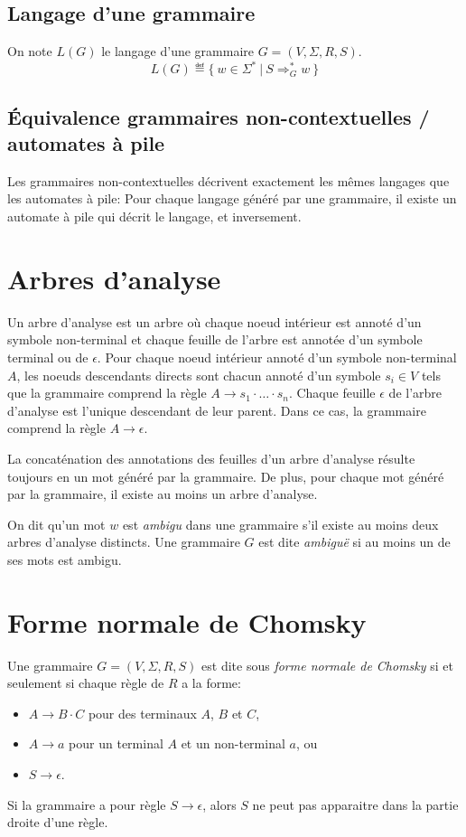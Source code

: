 \subsection{Langage d'une grammaire}

On note $L(G)$ le langage d'une grammaire $G = (V, \Sigma, R, S)$.
\[
L(G) \eqdef \{\ w \in \Sigma^*\ |\ S \Rightarrow_G^* w\ \}
\]

\subsection{Équivalence grammaires non-contextuelles / automates à pile}

Les grammaires non-contextuelles décrivent exactement les mêmes langages que les automates à pile:
Pour chaque langage généré par une grammaire, il existe un automate à pile qui décrit le langage, et inversement.

\section{Arbres d'analyse}

Un arbre d'analyse est un arbre où chaque noeud intérieur est annoté d'un symbole non-terminal et chaque feuille de l'arbre est annotée d'un symbole terminal ou de $\epsilon$.
Pour chaque noeud intérieur annoté d'un symbole non-terminal $A$, les noeuds descendants directs sont chacun annoté d'un symbole $s_i \in V$ tels que la grammaire comprend la règle $A \to s_1 \cdot \ldots \cdot s_n$.
Chaque feuille $\epsilon$ de l'arbre d'analyse est l'unique descendant de leur parent. Dans ce cas, la grammaire comprend la règle $A \to \epsilon$.

La concaténation des annotations des feuilles d'un arbre d'analyse résulte toujours en un mot généré par la grammaire.
De plus, pour chaque mot généré par la grammaire, il existe au moins un arbre d'analyse.

On dit qu'un mot $w$ est \og \textit{ambigu} \fg{} dans une grammaire s'il existe au moins deux arbres d'analyse distincts.
Une grammaire $G$ est dite \og \textit{ambiguë} \fg{} si au moins un de ses mots est ambigu.

\section{Forme normale de Chomsky}

Une grammaire $G = (V, \Sigma, R, S)$ est dite sous \og \textit{forme normale de Chomsky} \fg{} si et seulement si chaque règle de $R$ a la forme:
\begin{itemize}
\item $A \to B \cdot C$ pour des terminaux $A$, $B$ et $C$,
\item $A \to a$ pour un terminal $A$ et un non-terminal $a$, ou
\item $S \to \epsilon$.
\end{itemize}
Si la grammaire a pour règle $S \to \epsilon$, alors $S$ ne peut pas apparaitre dans la partie droite d'une règle.


